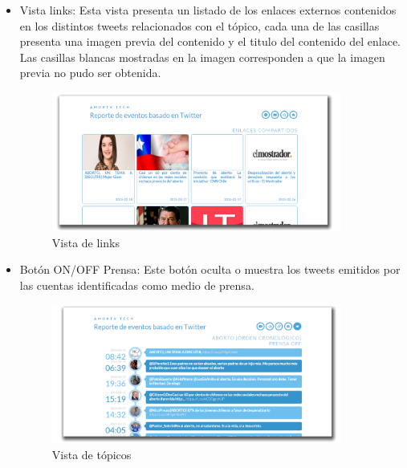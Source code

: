 \begin{itemize}
	\item {Vista links}: Esta vista presenta un listado de los enlaces externos contenidos en los distintos tweets relacionados con el tópico, cada una de las casillas presenta una imagen previa del contenido y el titulo del contenido del enlace. Las casillas blancas mostradas en la imagen corresponden a que la imagen previa no pudo ser obtenida.
	\begin{figure}[H]
		\centering
		\includegraphics[width=0.9\textwidth]{imgs/vistas_links.PNG}
		\caption{Vista de links}
		\label{fig:vista_links}
	\end{figure}
		
	\item {Botón ON/OFF Prensa}: Este botón oculta o muestra los tweets emitidos por las cuentas identificadas como medio de prensa.
	\begin{figure}[H]
		\centering
		\includegraphics[width=0.9\textwidth]{imgs/vistas_prensa_off.PNG}
		\caption{Vista de tópicos}
		\label{fig:vista_btnprensa_off}
	\end{figure}
	

	
\end{itemize}